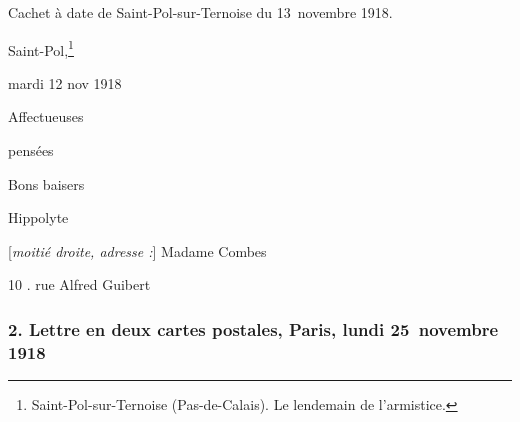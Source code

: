 Cachet à date de Saint-Pol-sur-Ternoise du 13~novembre 1918.

\begin{LJlettre}
 Saint-Pol,\footnote{Saint-Pol-sur-Ternoise (Pas-de-Calais). Le lendemain de l'armistice.}

mardi 12 nov 1918

Affectueuses

pensées

Bons baisers

Hippolyte

[\textit{moitié droite, adresse :}] Madame Combes\nopagebreak

10 . rue Alfred Guibert\nopagebreak

 
\end{LJlettre}

\subsubsection*{2. Lettre en deux cartes postales, Paris, lundi 25~novembre 1918}

